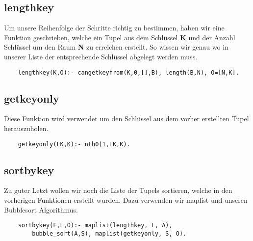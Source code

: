 \newpage

\subsection{lengthkey}
Um unsere Reihenfolge der Schritte richtig zu bestimmen, haben wir eine Funktion geschrieben,
welche ein Tupel aus dem Schlüssel \textbf{K} und der Anzahl Schlüssel um den Raum \textbf{N}
zu erreichen erstellt. So wissen wir genau wo in unserer Liste der entsprechende Schlüssel
abgelegt werden muss.

\begin{verbatim}
    lengthkey(K,O):- cangetkeyfrom(K,0,[],B), length(B,N), O=[N,K].
\end{verbatim}

\subsection{getkeyonly}
Diese Funktion wird verwendet um den Schlüssel aus dem vorher erstellten Tupel herauszuholen.

\begin{verbatim}
    getkeyonly(LK,K):- nth0(1,LK,K).
\end{verbatim}

\subsection{sortbykey}
Zu guter Letzt wollen wir noch die Liste der Tupels sortieren, welche in den vorherigen Funktionen
erstellt wurden. Dazu verwenden wir maplist und unseren Bubblesort Algorithmus.

\begin{verbatim}
    sortbykey(F,L,O):- maplist(lengthkey, L, A), 
        bubble_sort(A,S), maplist(getkeyonly, S, O).
\end{verbatim}